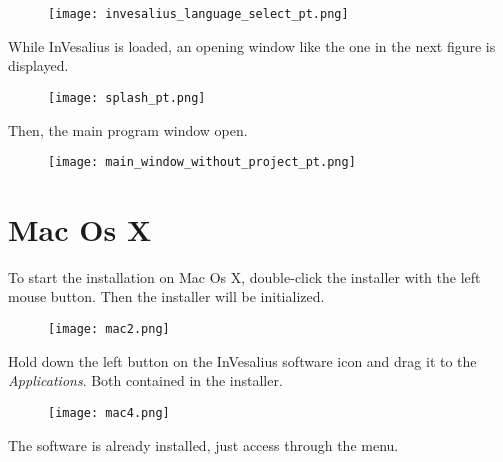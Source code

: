 \begin{figure}[!htb]
\centering
\texttt{[image: invesalius\_language\_select\_pt.png]}
\end{figure}

\newpage


While InVesalius is loaded, an opening window like the one in the next figure is displayed.

\begin{figure}[!htb]
\centering
\texttt{[image: splash\_pt.png]}
\end{figure}

\hspace{.2cm}

Then, the main program window open.

\begin{figure}[!htb]
\centering
\texttt{[image: main\_window\_without\_project\_pt.png]}
\end{figure}

\section{Mac Os X}


To start the installation on Mac Os X, double-click the installer with the left mouse button.
Then the installer will be initialized.

\begin{figure}[!htb]
\centering
\texttt{[image: mac2.png]}
\end{figure}


Hold down the left button on the InVesalius software icon and drag it to the \textit{Applications}. Both contained in the installer.

\begin{figure}[!htb]
\centering
\texttt{[image: mac4.png]}
\end{figure}

The software is already installed, just access through the menu.